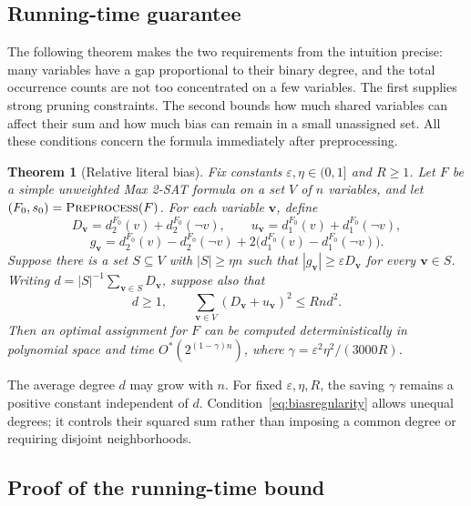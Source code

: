 \documentclass[11pt,a4paper]{article}
\newtheorem{theorem}{Theorem}[section]
\theoremstyle{definition}
\theoremstyle{remark}
\newcommand{\Ostar}{O^{*}}
\begin{document}
\subsection{Running-time guarantee}

The following theorem makes the two requirements from the intuition
precise: many variables have a gap proportional to their binary degree,
and the total occurrence counts are not too concentrated on a few
variables. The first supplies strong pruning constraints. The second
bounds how much shared variables can affect their sum and how much bias
can remain in a small unassigned set. All these conditions concern the
formula immediately after preprocessing.

\begin{theorem}[Relative literal bias]\label{thm:bias}
Fix constants $\varepsilon,\eta\in(0,1]$ and $R\ge1$.
Let $F$ be a simple unweighted Max 2-SAT formula on a set $V$ of $n$ variables, and let
$(F_0,s_0)=\textnormal{\textsc{Preprocess}}(F)$. For each variable $\mathbf v$, define
\[
 D_{\mathbf v}=d_2^{F_0}(v)+d_2^{F_0}(\neg v),\qquad
 u_{\mathbf v}=d_1^{F_0}(v)+d_1^{F_0}(\neg v),
\]
\[
 g_{\mathbf v}=d_2^{F_0}(v)-d_2^{F_0}(\neg v)
                    +2\bigl(d_1^{F_0}(v)-d_1^{F_0}(\neg v)\bigr).
\]
Suppose there is a set $S\subseteq V$ with $|S|\ge\eta n$ such that
$|g_{\mathbf v}|\ge\varepsilon D_{\mathbf v}$ for every $\mathbf v\in S$.
Writing $d=|S|^{-1}\sum_{\mathbf v\in S}D_{\mathbf v}$, suppose also that
\begin{equation}
 d\ge1,\qquad
 \sum_{\mathbf v\in V}(D_{\mathbf v}+u_{\mathbf v})^2\le Rnd^2.
 \label{eq:biasregularity}
\end{equation}
Then an optimal assignment for $F$ can be computed deterministically in
polynomial space and time $\Ostar(2^{(1-\gamma)n})$, where
$\gamma=\varepsilon^2\eta^2/(3000R)$.
\end{theorem}

The average degree $d$ may grow with $n$. For fixed
$\varepsilon,\eta,R$, the saving $\gamma$ remains a positive constant
independent of $d$. Condition~\eqref{eq:biasregularity} allows unequal
degrees; it controls their squared sum rather than imposing a common
degree or requiring disjoint neighborhoods.

\subsection{Proof of the running-time bound}
\end{document}
